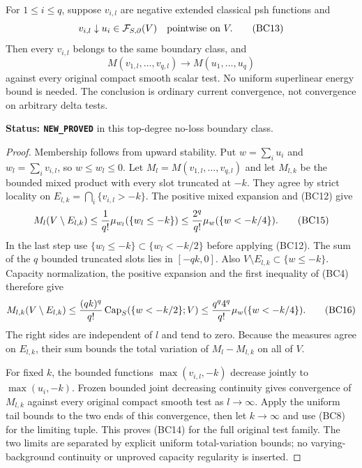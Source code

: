 \begin{theorem}
\label{thm:r11-boundary-joint-decreasing}
For $1\leq i\leq q$, suppose $v_{i,l}$ are negative extended
classical psh functions and
\[
              v_{i,l}\downarrow u_i\in\mathcal F_{S,\partial}(V)
                         \quad\hbox{pointwise on }V.
 \tag{BC13}
\]
Then every $v_{i,l}$ belongs to the same boundary class, and
\[
       M(v_{1,l},\ldots,v_{q,l})
                       \longrightarrow M(u_1,\ldots,u_q)
 \tag{BC14}
\]
against every original compact smooth scalar test. No uniform
superlinear energy bound is needed. The conclusion is ordinary
current convergence, not convergence on arbitrary delta tests.
\end{theorem}

\noindent\textbf{Status: \texttt{NEW\_PROVED}} in this top-degree
no-loss boundary class.

\begin{proof}
Membership follows from upward stability. Put $w=\sum_i u_i$
and $w_l=\sum_i v_{i,l}$, so $w\leq w_l\leq0$. Let
$M_l=M(v_{1,l},\ldots,v_{q,l})$ and let $M_{l,k}$ be the
bounded mixed product with every slot truncated at $-k$.
They agree by strict locality on
$E_{l,k}=\bigcap_i\{v_{i,l}>-k\}$. The positive mixed expansion
and (BC12) give
\[
 M_l(V\setminus E_{l,k})
 \leq {1\over q!}\mu_{w_l}(\{w_l\leq-k\})
 \leq {2^q\over q!}\mu_w(\{w<-k/4\}).
 \tag{BC15}
\]
In the last step use $\{w_l\leq-k\}\subset\{w_l<-k/2\}$
before applying (BC12).
The sum of the $q$ bounded truncated slots lies in $[-qk,0]$.
Also $V\setminus E_{l,k}\subset\{w\leq-k\}$. Capacity
normalization, the positive expansion and the first inequality
of (BC4) therefore give
\[
 M_{l,k}(V\setminus E_{l,k})
 \leq{(qk)^q\over q!}\operatorname{Cap}_S(\{w<-k/2\};V)
 \leq{q^q4^q\over q!}\mu_w(\{w<-k/4\}).
 \tag{BC16}
\]
The right sides are independent of $l$ and tend to zero.
Because the measures agree on $E_{l,k}$, their sum bounds the
total variation of $M_l-M_{l,k}$ on all of $V$.

For fixed $k$, the bounded functions
$\max(v_{i,l},-k)$ decrease jointly to $\max(u_i,-k)$.
Frozen bounded joint decreasing continuity gives convergence of
$M_{l,k}$ against every original compact smooth test as
$l\to\infty$. Apply the uniform tail bounds to the two ends
of this convergence, then let $k\to\infty$ and use (BC8) for
the limiting tuple. This proves (BC14) for the full original
test family. The two limits are separated by explicit uniform
total-variation bounds; no varying-background continuity or
unproved capacity regularity is inserted.
\end{proof}

